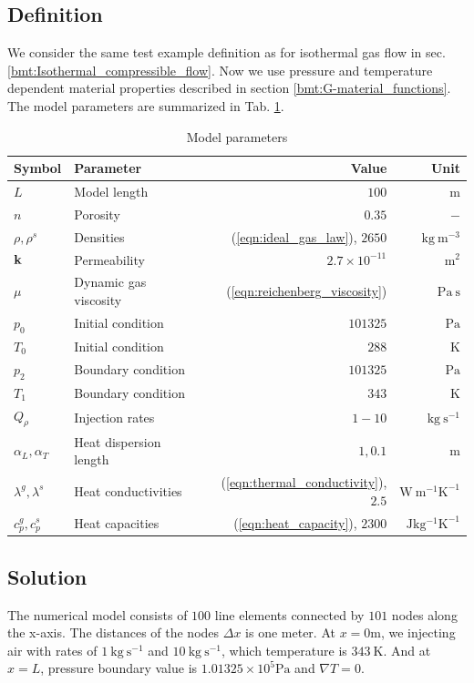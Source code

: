 \subsection{Definition}
We consider the same test example definition as for isothermal gas flow in sec. \ref{bmt:Isothermal_compressible_flow}. Now we use pressure and temperature dependent material properties described in section \ref{bmt:G-material_functions}. The model parameters are summarized in Tab. \ref{tab:air_heat_1d}.
\begin{table}[h]
\caption{\label{tab:air_heat_1d}Model parameters}
\begin{center}
\begin{tabular}{llrr}
\toprule
Symbol & Parameter & Value & Unit \\
\midrule
$L$ & Model length & $100$ & $\mathrm{m}$\\
$n$ & Porosity & $0.35$  & $-$ \\
$\rho,\rho^s$ & Densities & (\ref{eqn:ideal_gas_law}), $2650$ & $\mathrm{kg~m^{-3}}$ \\
$\mathbf k$ & Permeability & $2.7\times 10^{-11}$ & $\mathrm{m^2}$\\
$\mu$ & Dynamic gas viscosity & (\ref{eqn:reichenberg_viscosity}) & $\mathrm{Pa~s}$\\
$p_0$ & Initial condition & $101325$ & $\mathrm{Pa}$\\
$T_0$ & Initial condition & $288$ & $\mathrm{K}$\\
$p_2$ & Boundary condition & $101325$ & $\mathrm{Pa}$\\
$T_1$ & Boundary condition & $343$ & $\mathrm{K}$\\
$Q_{\rho}$ & Injection rates & $1-10$ & $\mathrm{kg~s^{-1}}$\\
$\alpha_L, \alpha_T$ & Heat dispersion length & $1, 0.1$ & $\mathrm{m}$\\
$\lambda^g, \lambda^s$ & Heat conductivities & (\ref{eqn:thermal_conductivity}), $2.5$ & $\mathrm {W~m^{-1} K^{-1}}$\\
$c_p^g, c_p^s$ & Heat capacities & (\ref{eqn:heat_capacity}), $2300$ & $\mathrm {J kg^{-1} K^{-1}}$\\
\bottomrule
\end{tabular}
\end{center}
\end{table}
\subsection{Solution}
The numerical model consists of $100$ line elements connected by $101$ nodes along the x-axis. The distances of the nodes $\Delta x$ is one meter. At $x=0\mathrm {m}$, we injecting air with rates of $1~\mathrm {kg~s^{-1}}$ and $10~\mathrm {kg~s^{-1}}$, which temperature is $343~\mathrm K$. And at $x=L$, pressure boundary value is $1.01325 \times 10^5 \mathrm {Pa}$ and $\nabla T=0$.

